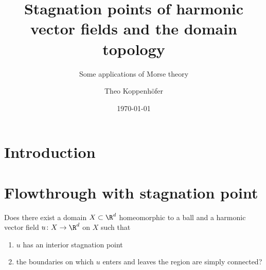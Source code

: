 





\title{Stagnation points of harmonic vector fields and the domain topology}
\subtitle{Some applications of Morse theory}
\author{Theo Koppenhöfer}
\date{\today}


\graphicspath{{../Plots/}}
\graphicspath{{../Figures/}}





\frame[plain]{\titlepage}


\section{Introduction}


\section{Flowthrough with stagnation point}

\begin{frame}
  \begin{question} \label{qu:flowthroughStagnationPoint}
		Does there exist a domain $X\subset\R^d$ homeomorphic to a ball and a harmonic vector field $u\colon X\to\R^d$ on $X$ such that
		\begin{enumerate}
		  \item $u$ has an interior stagnation point
		  \item the boundaries on which $u$ enters and leaves the region are simply connected?
		\end{enumerate}
	\end{question}
\end{frame}

